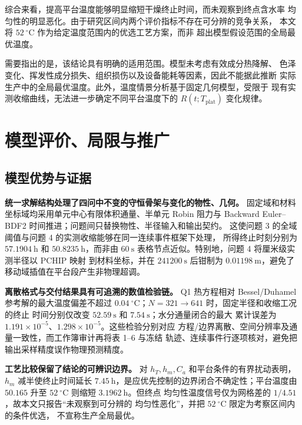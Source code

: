 \documentclass[withoutpreface,bwprint]{cumcmthesis}
\begin{document}
综合来看，提高平台温度能够明显缩短干燥终止时间，而未观察到终点含水率
均匀性的明显恶化。由于研究区间内两个评价指标不存在可分辨的竞争关系，
本文将 $52\ ^\circ\mathrm{C}$ 作为给定温度范围内的优选工艺方案，而非
超出模型假设范围的全局最优温度。

需要指出的是，该结论具有明确的适用范围。模型未考虑有效成分热降解、
色泽变化、挥发性成分损失、组织损伤以及设备能耗等因素，因此不能据此推断
实际生产中的全局最优温度。此外，温度情景分析基于固定几何模型，受限于
现有实测收缩曲线，无法进一步确定不同平台温度下的
$R(t;T_{\mathrm{plat}})$ 变化规律。

\section{模型评价、局限与推广}

\subsection{模型优势与证据}

\textbf{统一求解结构处理了四问中不变的守恒骨架与变化的物性、几何。}
固定域和材料坐标域均采用单元中心有限体积通量、半单元 Robin 阻力与
Backward Euler--BDF2 时间推进；问题间只替换物性、半径输入和输出契约。
这使问题 3 的全域阈值与问题 4 的实测收缩能够在同一连续事件框架下处理，
所得终止时刻分别为 $57.1904\ \mathrm{h}$ 和 $50.8235\ \mathrm{h}$，而非由
$60\ \mathrm{s}$ 表格节点近似。特别地，问题 4 将厘米级实测半径以 PCHIP 映射
到材料坐标，并在 $241200\ \mathrm{s}$ 后钳制为 $0.01198\ \mathrm{m}$，避免了
移动域插值在平台段产生非物理超调。

\textbf{离散格式与交付结果具有可追溯的数值检验链。}
Q1 热方程相对 Bessel/Duhamel 参考解的最大温度偏差不超过
$0.04\ ^\circ\mathrm{C}$；$N=321\to641$ 时，固定半径和收缩工况的终止
时间分别仅改变 $52.59\ \mathrm{s}$ 和 $7.54\ \mathrm{s}$；水分通量闭合的最大
累计误差为 $1.191\times10^{-5}$、$1.298\times10^{-5}$。这些检验分别对应
方程/边界离散、空间分辨率及通量一致性，而工作簿审计再将表 1--6 与冻结
轨迹、连续事件行逐项核对，避免把输出采样精度误作物理预测精度。

\textbf{工艺比较保留了结论的可辨识边界。}
对 $h_T,h_m,C_a$ 和平台条件的有界扰动表明，$h_m$ 减半使终止时间延长
$7.45\ \mathrm{h}$，是应优先控制的边界闭合不确定性；平台温度由
$50.165$ 升至 $52\ ^\circ\mathrm{C}$ 则缩短 $3.1962\ \mathrm{h}$。但终点
均匀性温度信号仅为网格差的 $1/4.51$，故本文只报告“未观察到可分辨的
均匀性恶化”，并把 $52\ ^\circ\mathrm{C}$ 限定为考察区间内的条件优选，
不宣称生产全局最优。
\end{document}
